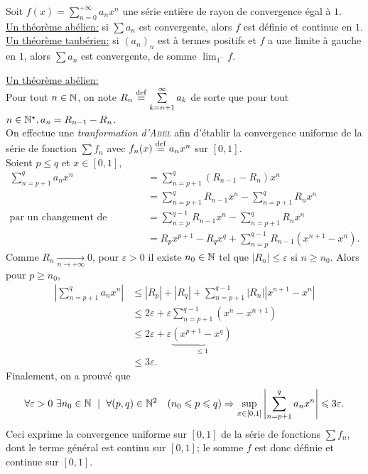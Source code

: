 \begin{theo}{}
Soit $f(x) = \sum\limits_{n=0}^{+\infty} a_n x^n$ une série entière de rayon de convergence égal à $1$. \\
\underline{Un théorème abélien:} si $\sum a_n$ est convergente, alors $f$ est définie et continue en $1$. \\
\underline{Un théorème taubérien:} si $(a_n)_n$ est à termes positifs et $f$ a une limite à gauche en $1$, alors $\sum a_n$ est convergente, de somme $\displaystyle \lim_{1^-}f$.
\end{theo}

\begin{preuve} 
    \underline{Un théorème abélien:} \\
    Pour tout $n \in \mathbb{N}$, on note $R_n \overset{\mathrm{\tiny def}}{=} \sum\limits_{k = n+1}^{\infty} a_k$ de sorte que pour tout $n \in \mathbb{N}^\star, a_n = R_{n-1} - R_n$. \\
    On effectue une \emph{tranformation d'\textsc{Abel}} afin d'établir la convergence uniforme de la série de fonction $\sum f_n$ avec $f_n(x) \overset{\mathrm{\tiny def}}{=} a_n x^n$ sur $[0, 1]$. \\
    Soient $p \leqslant q$ et $x \in [0,1]$,
    \begin{align*}
        \sum_{n=p+1}^q a_n x^n &= \sum_{n=p+1}^q (R_{n-1} -R_n) x^n \\
        &= \sum_{n=p+1}^q R_{n-1} x^n - \sum_{n=p+1}^q R_n x^n \\
    \text{par un changement de variable} &= \sum_{n=p}^{q-1} R_{n-1} x^n - \sum_{n=p+1}^q R_n x^n \\
    &= R_px^{p+1} - R_q x^q + \sum_{n=p}^{q-1} R_{n-1} (x^{n+1}-x^n).
    \end{align*}
    Comme $R_n \xrightarrow[n \to +\infty]{}0$, pour $\varepsilon > 0$ il existe $n_0 \in \mathbb{N}$ tel que $|R_n| \leqslant \varepsilon$ si $n \geqslant n_0$. Alors pour $p \geqslant n_0$, 
    \begin{align*}
        \left| \sum_{n=p+1}^q a_n x^n \right| &\leqslant |R_p| + |R_q| + \sum_{n=p+1}^{q-1} |R_n||x^{n+1}-x^n| \\
        &\leqslant 2 \varepsilon + \varepsilon \sum_{n=p+1}^{q-1} (x^n-x^{n+1}) \\
        &\leqslant 2 \varepsilon + \varepsilon \underbrace{(x^{p+1}-x^q)}_{\leqslant 1} \\
        &\leqslant 3 \varepsilon.
    \end{align*}
    Finalement, on a prouvé que
    $$\forall \varepsilon > 0\ \exists n_0 \in \mathbb{N}\ \mid\ \forall(p,q) \in \mathbb{N}^2 \quad (n_0 \leqslant p \leqslant q) \Rightarrow \sup_{x \in [0, 1]} \left| \sum_{n=p+1}^q a_n x^n \right| \leqslant 3 \varepsilon.$$
    Ceci exprime la convergence uniforme sur $[0, 1]$ de la série de fonctions $\sum f_n$, dont le terme général est continu sur $[0,1]$; le somme $f$ est donc définie et continue sur $[0, 1]$.
\end{preuve}